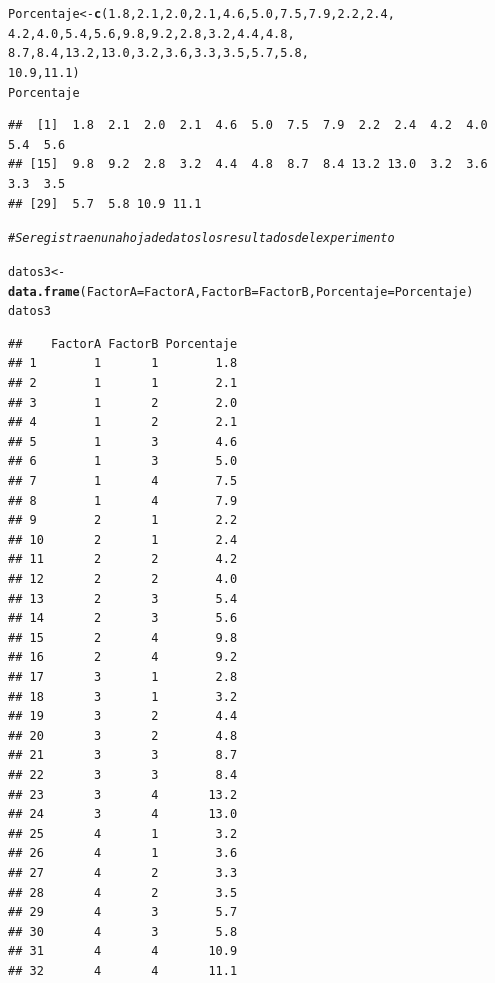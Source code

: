 \documentclass[12pt,letterpaper]{article}\usepackage[]{graphicx}\usepackage[]{color}
\makeatletter
\newcommand{\hlnum}[1]{\textcolor[rgb]{0.686,0.059,0.569}{#1}}%
\newcommand{\hlcom}[1]{\textcolor[rgb]{0.678,0.584,0.686}{\textit{#1}}}%
\newcommand{\hlstd}[1]{\textcolor[rgb]{0.345,0.345,0.345}{#1}}%
\newcommand{\hlkwb}[1]{\textcolor[rgb]{0.69,0.353,0.396}{#1}}%
\newcommand{\hlkwc}[1]{\textcolor[rgb]{0.333,0.667,0.333}{#1}}%
\newcommand{\hlkwd}[1]{\textcolor[rgb]{0.737,0.353,0.396}{\textbf{#1}}}%
\newenvironment{kframe}{%
 \def\at@end@of@kframe{}%
 \ifinner\ifhmode%
  \def\at@end@of@kframe{\end{minipage}}%
  \begin{minipage}{\columnwidth}%
 \fi\fi%
 \def\FrameCommand##1{\hskip\@totalleftmargin \hskip-\fboxsep
 \colorbox{shadecolor}{##1}\hskip-\fboxsep
     \hskip-\linewidth \hskip-\@totalleftmargin \hskip\columnwidth}%
 \MakeFramed {\advance\hsize-\width
   \@totalleftmargin\z@ \linewidth\hsize
   \@setminipage}}%
 {\par\unskip\endMakeFramed%
 \at@end@of@kframe}
\newenvironment{knitrout}{}{} %
\makeatother
\begin{document}
\begin{knitrout}
\begin{kframe}
\begin{alltt}
\hlstd{Porcentaje} \hlkwb{<-} \hlkwd{c}\hlstd{(}\hlnum{1.8}\hlstd{,} \hlnum{2.1}\hlstd{,} \hlnum{2.0}\hlstd{,} \hlnum{2.1}\hlstd{,} \hlnum{4.6}\hlstd{,} \hlnum{5.0}\hlstd{,} \hlnum{7.5}\hlstd{,} \hlnum{7.9}\hlstd{,} \hlnum{2.2}\hlstd{,} \hlnum{2.4}\hlstd{,}
                \hlnum{4.2}\hlstd{,} \hlnum{4.0}\hlstd{,} \hlnum{5.4}\hlstd{,} \hlnum{5.6}\hlstd{,} \hlnum{9.8}\hlstd{,} \hlnum{9.2}\hlstd{,} \hlnum{2.8}\hlstd{,} \hlnum{3.2}\hlstd{,} \hlnum{4.4}\hlstd{,} \hlnum{4.8}\hlstd{,}
                \hlnum{8.7}\hlstd{,} \hlnum{8.4}\hlstd{,} \hlnum{13.2}\hlstd{,} \hlnum{13.0}\hlstd{,} \hlnum{3.2}\hlstd{,} \hlnum{3.6}\hlstd{,} \hlnum{3.3}\hlstd{,} \hlnum{3.5}\hlstd{,} \hlnum{5.7}\hlstd{,} \hlnum{5.8}\hlstd{,}
                \hlnum{10.9}\hlstd{,} \hlnum{11.1}\hlstd{)}
\hlstd{Porcentaje}
\end{alltt}
\begin{verbatim}
##  [1]  1.8  2.1  2.0  2.1  4.6  5.0  7.5  7.9  2.2  2.4  4.2  4.0  5.4  5.6
## [15]  9.8  9.2  2.8  3.2  4.4  4.8  8.7  8.4 13.2 13.0  3.2  3.6  3.3  3.5
## [29]  5.7  5.8 10.9 11.1
\end{verbatim}
\begin{alltt}
\hlcom{# Se registra en una hoja de datos los resultados del experimento }

\hlstd{datos3} \hlkwb{<-} \hlkwd{data.frame}\hlstd{(}\hlkwc{FactorA} \hlstd{= FactorA,} \hlkwc{FactorB} \hlstd{= FactorB,} \hlkwc{Porcentaje}\hlstd{=Porcentaje)}
\hlstd{datos3}
\end{alltt}
\begin{verbatim}
##    FactorA FactorB Porcentaje
## 1        1       1        1.8
## 2        1       1        2.1
## 3        1       2        2.0
## 4        1       2        2.1
## 5        1       3        4.6
## 6        1       3        5.0
## 7        1       4        7.5
## 8        1       4        7.9
## 9        2       1        2.2
## 10       2       1        2.4
## 11       2       2        4.2
## 12       2       2        4.0
## 13       2       3        5.4
## 14       2       3        5.6
## 15       2       4        9.8
## 16       2       4        9.2
## 17       3       1        2.8
## 18       3       1        3.2
## 19       3       2        4.4
## 20       3       2        4.8
## 21       3       3        8.7
## 22       3       3        8.4
## 23       3       4       13.2
## 24       3       4       13.0
## 25       4       1        3.2
## 26       4       1        3.6
## 27       4       2        3.3
## 28       4       2        3.5
## 29       4       3        5.7
## 30       4       3        5.8
## 31       4       4       10.9
## 32       4       4       11.1
\end{verbatim}
\end{kframe}
\end{knitrout}
\end{document}
